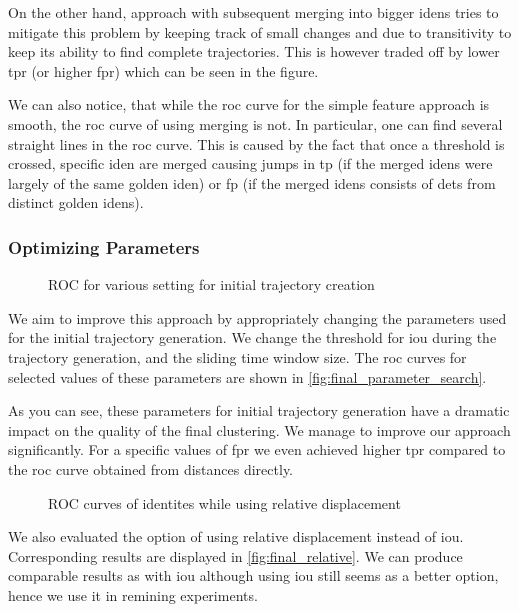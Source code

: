 On the other hand, approach with subsequent merging into bigger \glspl{iden} tries to mitigate this problem by keeping track of small changes and due to transitivity to keep its ability to find complete trajectories. This is however traded off by lower \gls{tpr} (or higher \gls{fpr}) which can be seen in the figure.

We can also notice, that while the \gls{roc} curve for the simple feature approach is smooth, the \gls{roc} curve of using merging is not. In particular, one can find several straight lines in the \gls{roc} curve. This is caused by the fact that once a threshold is crossed, specific \gls{iden} are merged causing jumps in \gls{tp} (if the merged \glspl{iden} were largely of the same golden \gls{iden}) or \gls{fp} (if the merged \glspl{iden} consists of \glspl{det} from distinct golden \glspl{iden}).

\subsubsection{Optimizing Parameters}

\begin{figure}
    \centering
    \def\svgwidth{\columnwidth}
    {}
    \caption{ROC for various setting for initial trajectory creation}
    \label{fig:final_parameter_search}
\end{figure}

We aim to improve this approach by appropriately changing the parameters used for the initial trajectory generation. We change the threshold for \gls{iou} during the trajectory generation, and the sliding time window size. The \gls{roc} curves for selected values of these parameters are shown in \autoref{fig:final_parameter_search}.

As you can see, these parameters for initial trajectory generation have a dramatic impact on the quality of the final clustering. We manage to improve our approach significantly. For a specific values of \gls{fpr} we even achieved higher \gls{tpr} compared to the \gls{roc} curve obtained from distances directly.

\begin{figure}
    \centering
    \def\svgwidth{\columnwidth}
    {}
    \caption{ROC curves of identites while using relative displacement}
    \label{fig:final_relative}
\end{figure}

We also evaluated the option of using relative displacement instead of \gls{iou}. Corresponding results are displayed in \autoref{fig:final_relative}. We can produce comparable results as with \gls{iou} although using \gls{iou} still seems as a better option, hence we use it in remining experiments.


